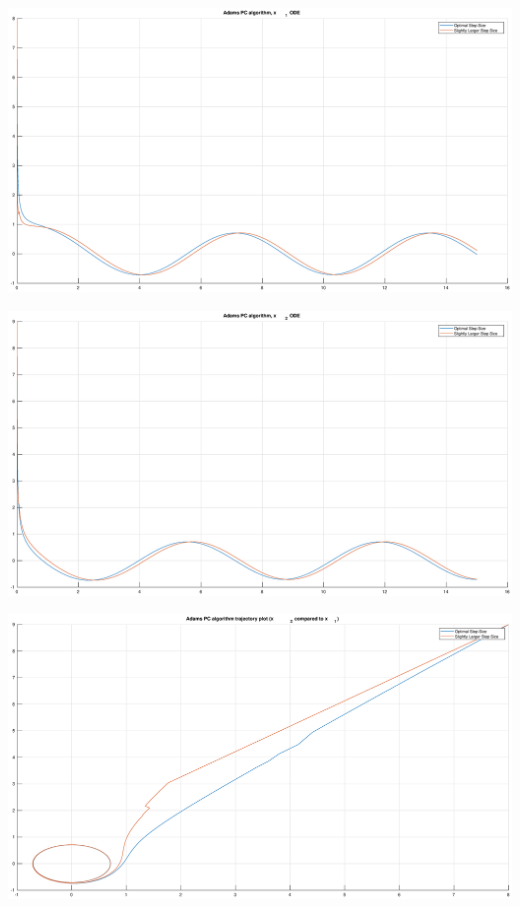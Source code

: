 \documentclass[12pt]{report}
\begin{document}
\begin{center}
   \includegraphics[scale=0.25]{23.eps}
\end{center}

\begin{center}
   \includegraphics[scale=0.25]{24.eps}
\end{center}

\begin{center}
   \includegraphics[scale=0.25]{25.eps}
\end{center}
\end{document}
